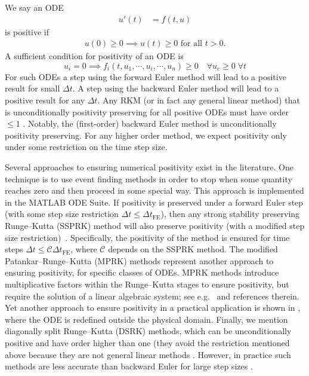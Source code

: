 \documentclass[a4paper]{article}
\numberwithin{equation}{section}
\theoremstyle{plain}
\theoremstyle{definition}
\numberwithin{theorem}{section}
\newcommand{\dt}{{\Delta t}}
\newcommand{\1}{\mathbbm{1}}
\begin{document}
We say an ODE
\begin{align} \label{ode}
    u'(t) & = f(t,u)
\end{align}
is positive if 
\begin{align} \label{continuous-positivity}
    u(0)\ge 0 \implies u(t) \ge 0 \text{ for all } t>0.
\end{align}
A sufficient condition for positivity of an ODE is 
\begin{equation} \label{eq:condition_ODE_pos}
u_i=0 \implies f_i(t,u_1,\cdots,u_i,\cdots,u_n) \geq 0 \quad \forall {u_c \geq 0}\; \forall {t} 
\end{equation} 
For such ODEs a step using the forward Euler method will lead to a positive result for small $\dt$.
A step using the backward Euler method will lead to a positive result for any $\dt$.
Any RKM (or in fact any general linear method) that is unconditionally positivity preserving for all positive ODEs
must have order $\le 1$ \cite{bolley_conservation_1978}. Notably, the (first-order)
backward Euler method is unconditionally positivity preserving.
For any higher order method, we expect positivity only under some restriction
on the time step size.

Several approaches to ensuring numerical positivity exist in the literature.
One technique is to use event finding methods in order to stop when some quantity
reaches zero and then proceed in some special way. This approach is implemented in the MATLAB ODE Suite.
If positivity is preserved under a forward Euler step (with
some step size restriction $\dt \le \dt_\text{FE}$), then any strong stability preserving Runge--Kutta (SSPRK)
method will also preserve positivity (with a modified step size restriction)~\cite{gottlieb_strong_2011}.
Specifically, the positivity of the method is ensured for time steps
$\dt \leq {\mathcal C} \dt_\text{FE}$, where ${\mathcal C}$ depends on the SSPRK method.
The modified Patankar--Runge--Kutta (MPRK) methods represent another approach to ensuring
positivity, for specific classes of ODEs.  MPRK methods introduce multiplicative
factors within the Runge--Kutta stages to ensure positivity, but require the solution
of a linear algebraic system; see e.g.\ \cite{kopecz_comparison_2019} and references therein.
Yet another approach to ensure positivity in a practical application is shown in \cite{shampine_non-negative_2005},
where the ODE is redefined outside the physical domain. 
Finally, we mention diagonally split Runge--Kutta (DSRK) methods, which can be unconditionally
positive and have order higher than one (they avoid the restriction mentioned above because
they are not general linear methods \cite{horvath_positivity_1998}.  However, in practice such
methods are less accurate than backward Euler for large step sizes \cite{macdonald2007}.
\end{document}
